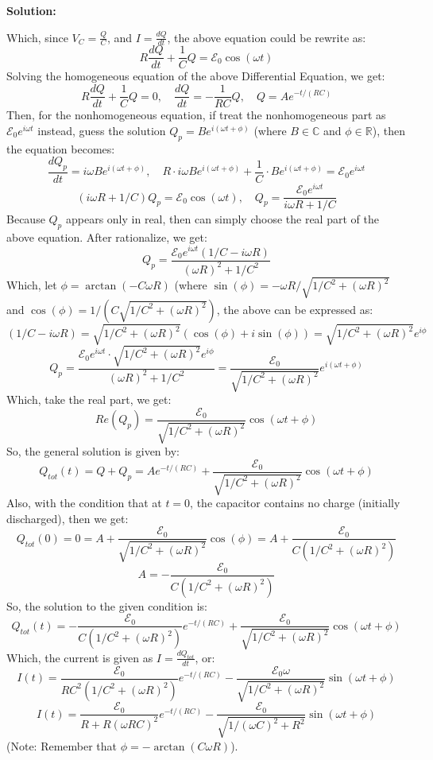\documentclass{article}
\begin{document}
\hfill

\textbf{Solution:}

Which, since $V_C = \frac{Q}{C}$, and $I=\frac{dQ}{dt}$, the above equation could be rewrite as:
$$R\frac{dQ}{dt}+\frac{1}{C}Q = \mathcal{E}_0\cos(\omega t)$$
Solving the homogeneous equation of the above Differential Equation, we get:
$$R\frac{dQ}{dt} + \frac{1}{C}Q = 0,\quad \frac{dQ}{dt}=-\frac{1}{RC}Q,\quad Q = Ae^{-t/(RC)}$$
Then, for the nonhomogeneous equation, if treat the nonhomogeneous part as $\mathcal{E}_0e^{i\omega t}$ instead, guess the solution 
$Q_p=Be^{i(\omega t+\phi)}$ (where $B\in\mathbb{C}$ and $\phi\in\mathbb{R}$), then the equation becomes:
$$\frac{dQ_p}{dt}=i\omega Be^{i(\omega t+\phi)},\quad R\cdot i\omega Be^{i(\omega t+\phi)} + \frac{1}{C}\cdot Be^{i(\omega t+\phi)} = \mathcal{E}_0e^{i\omega t}$$
$$(i\omega R+1/C)Q_p=\mathcal{E}_0\cos(\omega t),\quad Q_p = \frac{\mathcal{E}_0e^{i\omega t}}{i\omega R+1/C}$$
Because $Q_p$ appears only in real, then can simply choose the real part of the above equation. After rationalize, we get:
$$Q_p = \frac{\mathcal{E}_0e^{i\omega t}(1/C-i\omega R)}{(\omega R)^2+1/C^2}$$
Which, let $\phi = \arctan(-C\omega R)$ (where $\sin(\phi)=-\omega R/\sqrt{1/C^2+(\omega R)^2}$ and $\cos(\phi)=1/(C\sqrt{1/C^2+(\omega R)^2})$, the above can be expressed as:
$$(1/C-i\omega R)=\sqrt{1/C^2+(\omega R)^2}(\cos(\phi)+i\sin(\phi)) = \sqrt{1/C^2+(\omega R)^2}e^{i\phi}$$
$$Q_p = \frac{\mathcal{E}_0e^{i\omega t}\cdot \sqrt{1/C^2+(\omega R)^2}e^{i\phi}}{(\omega R)^2+1/C^2} = \frac{\mathcal{E}_0}{\sqrt{1/C^2+(\omega R)^2}}e^{i(\omega t+\phi)}$$
Which, take the real part, we get:
$$Re(Q_p) = \frac{\mathcal{E}_0}{\sqrt{1/C^2+(\omega R)^2}}\cos(\omega t+\phi)$$
So, the general solution is given by:
$$Q_{tot}(t)=Q+Q_p=Ae^{-t/(RC)}+\frac{\mathcal{E}_0}{\sqrt{1/C^2+(\omega R)^2}}\cos(\omega t+\phi)$$
Also, with the condition that at $t=0$, the capacitor contains no charge (initially discharged), then we get:
$$Q_{tot}(0)=0 = A+\frac{\mathcal{E}_0}{\sqrt{1/C^2+(\omega R)^2}}\cos(\phi) =A+ \frac{\mathcal{E}_0}{C(1/C^2+(\omega R)^2)}$$
$$A=-\frac{\mathcal{E}_0}{C(1/C^2+(\omega R)^2)}$$
So, the solution to the given condition is:
$$Q_{tot}(t)=-\frac{\mathcal{E}_0}{C(1/C^2+(\omega R)^2)}e^{-t/(RC)}+\frac{\mathcal{E}_0}{\sqrt{1/C^2+(\omega R)^2}}\cos(\omega t+\phi)$$
Which, the current is given as $I=\frac{dQ_{tot}}{dt}$, or:
$$I(t)=\frac{\mathcal{E}_0}{RC^2(1/C^2+(\omega R)^2)}e^{-t/(RC)}-\frac{\mathcal{E}_0\omega}{\sqrt{1/C^2+(\omega R)^2}}\sin(\omega t+\phi)$$
$$I(t)=\frac{\mathcal{E}_0}{R+R(\omega RC)^2}e^{-t/(RC)}-\frac{\mathcal{E}_0}{\sqrt{1/(\omega C)^2+R^2}}\sin(\omega t+\phi)$$
(Note: Remember that $\phi=-\arctan(C\omega R)$).
\end{document}

